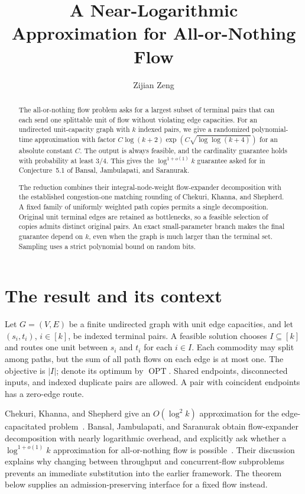 \documentclass[acmsmall,11pt,screen,nonacm]{acmart}
\title{A Near-Logarithmic Approximation for All-or-Nothing Flow}
\author{Zijian Zeng}
\affiliation{\institution{UCSI University}\city{Kuala Lumpur}\country{Malaysia}}
\newcommand{\OPT}{\operatorname{OPT}}
\begin{document}
\begin{abstract}
\normalsize
The all-or-nothing flow problem asks for a largest subset of terminal pairs that
can each send one splittable unit of flow without violating edge capacities.
For an undirected unit-capacity graph with $k$ indexed pairs, we give a randomized
polynomial-time approximation with factor
$C\log(k+2)\exp(C\sqrt{\log\log(k+4)})$ for an absolute constant $C$.
The output is always feasible, and the cardinality guarantee holds with
probability at least $3/4$. This gives the $\log^{1+o(1)}k$ guarantee asked for
in Conjecture~5.1 of Bansal, Jambulapati, and Saranurak.

The reduction combines their integral-node-weight flow-expander decomposition
with the established congestion-one matching rounding of Chekuri, Khanna, and
Shepherd. A fixed family of uniformly weighted path copies permits a single
decomposition. Original unit terminal edges are retained as bottlenecks, so a
feasible selection of copies admits distinct original pairs. An exact
small-parameter branch makes the final guarantee depend on $k$, even when the
graph is much larger than the terminal set. Sampling uses a strict polynomial
bound on random bits.
\end{abstract}
\maketitle
\pagestyle{plain}
\raggedbottom
\clearpage

\section{The result and its context}

Let $G=(V,E)$ be a finite undirected graph with unit edge capacities, and let
$(s_i,t_i)$, $i\in[k]$, be indexed terminal pairs. A feasible solution chooses
$I\subseteq[k]$ and routes one unit between $s_i$ and $t_i$ for each $i\in I$.
Each commodity may split among paths, but the sum of all path flows on each
edge is at most one. The objective is $|I|$; denote its optimum by $\OPT$.
Shared endpoints, disconnected inputs, and indexed duplicate pairs are allowed.
A pair with coincident endpoints has a zero-edge route.

Chekuri, Khanna, and Shepherd give an $O(\log^2 k)$ approximation for the
edge-capacitated problem~\cite[Theorem~3.2]{CKS05}. Bansal, Jambulapati, and
Saranurak obtain flow-expander decomposition with nearly logarithmic overhead,
and explicitly ask whether a $\log^{1+o(1)}k$ approximation for all-or-nothing
flow is possible~\cite[Conjecture~5.1]{BJS26}. Their discussion explains why
changing between throughput and concurrent-flow subproblems prevents an
immediate substitution into the earlier framework. The theorem below supplies
an admission-preserving interface for a fixed flow instead.
\end{document}
